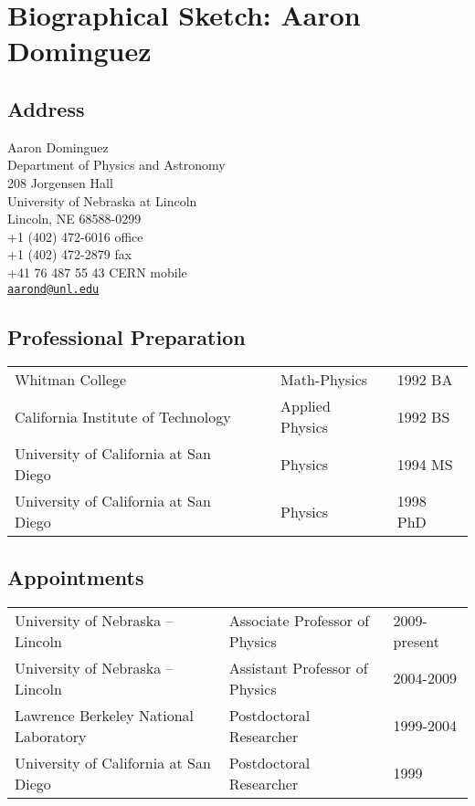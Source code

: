 \documentclass[11pt]{article}
\begin{document}
\section*{Biographical Sketch: Aaron Dominguez}
\label{sec:bio}
\subsection*{Address}
Aaron Dominguez\\
Department of Physics and Astronomy\\
208 Jorgensen Hall\\
University of Nebraska at Lincoln\\
Lincoln, NE  68588-0299\\
+1 (402) 472-6016 office\\
+1 (402) 472-2879 fax\\
+41 76 487 55 43 CERN mobile\\
\href{mailto:aarond@unl.edu}{\texttt{aarond@unl.edu}}

\subsection*{Professional Preparation}
\begin{tabular}[c]{lll}
Whitman College                          & Math-Physics                     & 1992 BA\\
California Institute of Technology       & Applied Physics                  & 1992 BS\\
University of California at San Diego\ \ & Physics                          & 1994 MS\\
University of California at San Diego\ \ & Physics                          & 1998 PhD\\
\end{tabular}


\subsection*{Appointments}
\begin{tabular}[c]{lll}
University of Nebraska -- Lincoln          & Associate Professor of
Physics & 2009-present \\
University of Nebraska -- Lincoln          & Assistant Professor of
Physics & 2004-2009 \\
Lawrence Berkeley National Laboratory\ \ & Postdoctoral Researcher & 1999-2004\\
University of California at San Diego\ \ & Postdoctoral Researcher & 1999
\end{tabular}
\end{document}
